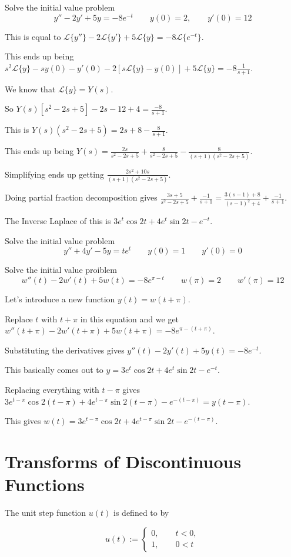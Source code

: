 \documentclass[../diffeq.tex]{subfiles}
\begin{document}
\pagebreak
\begin{example}
    Solve the initial value problem 
    \[ y''-2y'+5y=-8e^{-t}\qquad y(0)=2, \qquad y'(0)=12 \]

    This is equal to $\mathcal{L}\{y''\}-2\mathcal{L}\{y'\}+5\mathcal{L}\{y\}=-8\mathcal{L}\{e^{-t}\}$.

    This ends up being $s^2\mathcal{L}\{y\}-sy(0)-y'(0)-2[s\mathcal{L}\{y\}-y(0)]+5\mathcal{L}\{y\}=-8\frac{1}{s+1}$.

    We know that $\mathcal{L}\{y\}=Y(s)$.

    So $Y(s)[s^2-2s+5]-2s-12+4=\frac{-8}{s+1}$.

    This is $Y(s)(s^2-2s+5)=2s+8-\frac{8}{s+1}$.

    This ends up being $Y(s)=\frac{2s}{s^2-2s+5}+\frac{8}{s^2-2s+5}-\frac{8}{(s+1)(s^2-2s+5)}$.

    Simplifying ends up getting $\frac{2s^2+10s}{(s+1)(s^2-2s+5)}$.

    Doing partial fraction decomposition gives $\frac{3s+5}{s^2-2s+5}+\frac{-1}{s+1}=\frac{3(s-1)+8}{(s-1)^2+4}+\frac{-1}{s+1}$.

    The Inverse Laplace of this is $3e^t \cos 2t + 4e^t \sin 2t - e^{-t}$.
\end{example}

\ex Solve the initial value problem 
\[ y''+4y'-5y=te^t \qquad y(0)=1 \qquad y'(0)=0 \]

\begin{example}
    Solve the initial value proiblem 
    \[ w''(t)-2w'(t)+5w(t)=-8e^{\pi-t} \qquad w(\pi)=2 \qquad w'(\pi)=12 \]

    Let's introduce a new function $y(t)=w(t+\pi)$.

    Replace $t$ with $t+\pi$ in this equation and we get $w''(t+\pi)-2w'(t+\pi)+5w(t+\pi)=-8e^{\pi-(t+\pi)}$.

    Substituting the derivatives gives $y''(t)-2y'(t)+5y(t)=-8e^{-t}$.

    This basically comes out to $y=3e^t\cos 2t+4e^t \sin 2t - e^{-t}$.

    Replacing everything with $t-\pi$ gives $3e^{t-\pi}\cos 2(t-\pi)+4e^{t-\pi}\sin 2(t-\pi)-e^{-(t-\pi)}=y(t-\pi)$.

    This gives $w(t)=3e^{t-\pi}\cos 2t + 4e^{t-\pi}\sin 2t - e^{-(t-\pi)}$.
\end{example}

\section{Transforms of Discontinuous Functions}
\begin{definition}
    The unit step function $u(t)$ is defined to by 

    \[ u(t) := \begin{cases}
        0, \qquad t<0, \\
        1, \qquad 0<t 
    \end{cases}
    \]
\end{definition}
\end{document}
